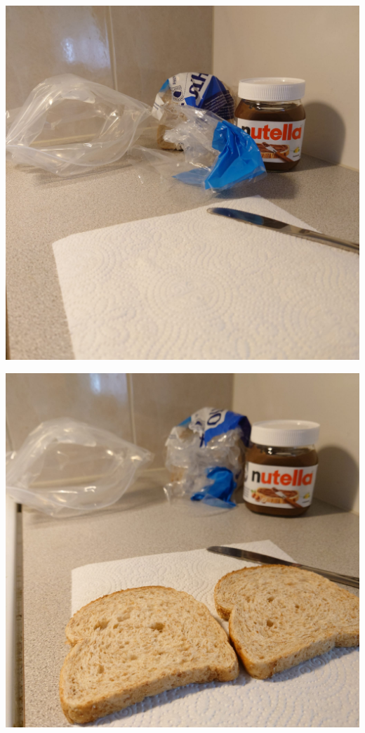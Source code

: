 \begin{multicols}{2}
\begin{Figure}\begin{center}
\noindent\includegraphics[width=0.9\linewidth]{assets/valipala1}
\end{center}\end{Figure}
\begin{Figure}\begin{center}
\noindent\includegraphics[width=0.9\linewidth]{assets/valipala2}
\end{center}\end{Figure}
\end{multicols}

